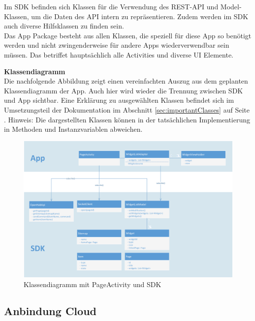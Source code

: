 Im SDK befinden sich Klassen für die Verwendung des REST-API und Model-Klassen, um die Daten des API intern zu repräsentieren. Zudem werden im SDK auch diverse Hilfsklassen zu finden sein. \\
Das App Package besteht aus allen Klassen, die speziell für diese App so benötigt werden und nicht zwingenderweise für andere Apps wiederverwendbar sein müssen. Das betriffet hauptsächlich alle Activities und diverse UI Elemente.

\textbf{Klassendiagramm}\\
Die nachfolgende Abbildung zeigt einen vereinfachten Auszug aus dem geplanten Klassendiagramm der App. Auch hier wird wieder die Trennung zwischen SDK und App sichtbar. Eine Erklärung zu ausgewählten Klassen befindet sich im Umsetzungsteil der Dokumentation im Abschnitt \ref{sec:importantClasses} auf Seite \pageref{sec:importantClasses}. Hinweis: Die dargestellten Klassen können in der tatsächlichen Implementierung in Methoden und Instanzvariablen abweichen.
\begin{figure}[H]
	\centering
		\includegraphics[width=\textwidth]{report/img/android_uml.png}
	\caption{Klassendiagramm mit PageActivity und SDK}
	\label{fig:androidUML}
\end{figure}


\subsection{Anbindung Cloud}

